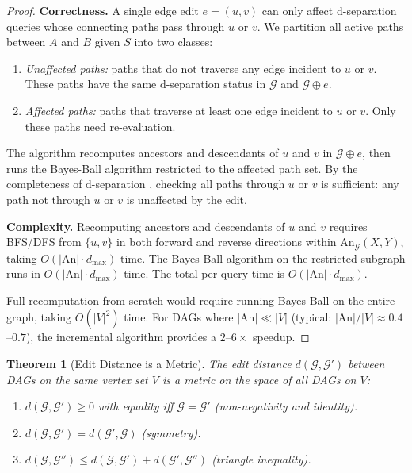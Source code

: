\documentclass[11pt,a4paper]{article}
\newtheorem{theorem}{Theorem}[section]
\theoremstyle{definition}
\theoremstyle{remark}
\newcommand{\DAG}{\mathcal{G}}
\newcommand{\An}{\mathrm{An}}
\newcommand{\editdist}{d}
\begin{document}
\begin{proof}
\textbf{Correctness.} A single edge edit $e = (u, v)$ can only affect d-separation
queries whose connecting paths pass through $u$ or $v$. We partition all active paths
between $A$ and $B$ given $S$ into two classes:
\begin{enumerate}
  \item \textit{Unaffected paths:} paths that do not traverse any edge incident to $u$
    or $v$. These paths have the same d-separation status in $\DAG$ and $\DAG \oplus e$.
  \item \textit{Affected paths:} paths that traverse at least one edge incident to $u$
    or $v$. Only these paths need re-evaluation.
\end{enumerate}

The algorithm recomputes ancestors and descendants of $u$ and $v$ in $\DAG \oplus e$,
then runs the Bayes-Ball algorithm \cite{shachter1998} restricted to the affected path
set. By the completeness of d-separation \cite{verma1988}, checking all paths through
$u$ or $v$ is sufficient: any path not through $u$ or $v$ is unaffected by the edit.

\medskip
\noindent\textbf{Complexity.} Recomputing ancestors and descendants of $u$ and $v$
requires BFS/DFS from $\{u, v\}$ in both forward and reverse directions within
$\An_\DAG(X,Y)$, taking $O(|\An| \cdot d_{\max})$ time. The Bayes-Ball algorithm on
the restricted subgraph runs in $O(|\An| \cdot d_{\max})$ time. The total per-query
time is $O(|\An| \cdot d_{\max})$.

Full recomputation from scratch would require running Bayes-Ball on the entire graph,
taking $O(|V|^2)$ time. For DAGs where $|\An| \ll |V|$ (typical: $|\An|/|V| \approx
0.4$--$0.7$), the incremental algorithm provides a $2$--$6\times$ speedup.
\end{proof}

\begin{theorem}[Edit Distance is a Metric]\label{thm:metric}
The edit distance $\editdist(\DAG, \DAG')$ between DAGs on the same vertex set $V$ is a
metric on the space of all DAGs on $V$:
\begin{enumerate}[label=(\roman*)]
  \item $\editdist(\DAG, \DAG') \geq 0$ with equality iff $\DAG = \DAG'$
    (non-negativity and identity).
  \item $\editdist(\DAG, \DAG') = \editdist(\DAG', \DAG)$ (symmetry).
  \item $\editdist(\DAG, \DAG'') \leq \editdist(\DAG, \DAG') + \editdist(\DAG', \DAG'')$
    (triangle inequality).
\end{enumerate}
\end{theorem}
\end{document}
